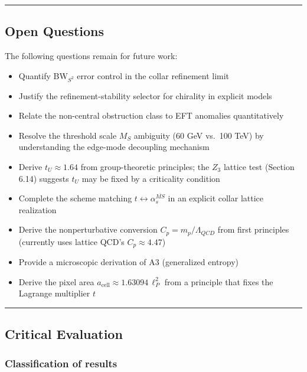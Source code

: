 \documentclass[11pt,a4paper]{article}
\theoremstyle{remark}
\providecommand{\tightlist}{%
  \setlength{\itemsep}{0pt}\setlength{\parskip}{0pt}}
\begin{document}
\begin{center}\rule{0.5\linewidth}{0.5pt}\end{center}

\subsection{Open Questions}\label{open-questions}

The following questions remain for future work:

\begin{itemize}
\tightlist
\item
  Quantify BW\(_{S^2}\) error control in the collar refinement limit
\item
  Justify the refinement-stability selector for chirality in explicit models
\item
  Relate the non-central obstruction class to EFT anomalies quantitatively
\item
  Resolve the threshold scale \(M_S\) ambiguity (60 GeV vs.~100 TeV) by understanding the edge-mode decoupling mechanism
\item
  Derive \(t_U \approx 1.64\) from group-theoretic principles; the \(Z_3\) lattice test (Section 6.14) suggests \(t_U\) may be fixed by a criticality condition
\item
  Complete the scheme matching \(t \leftrightarrow \alpha_s^{\overline{MS}}\) in an explicit collar lattice realization
\item
  Derive the nonperturbative conversion \(C_p = m_p/\Lambda_{QCD}\) from first principles (currently uses lattice QCD's \(C_p \approx 4.47\))
\item
  Provide a microscopic derivation of A3 (generalized entropy)
\item
  Derive the pixel area \(a_\mathrm{cell} \approx 1.63094\,\ell_P^2\) from a principle that fixes the Lagrange multiplier \(t\)
\end{itemize}

\begin{center}\rule{0.5\linewidth}{0.5pt}\end{center}

\subsection{Critical Evaluation}\label{critical-evaluation}

\subsubsection{Classification of results}\label{classification-of-results}
\end{document}
